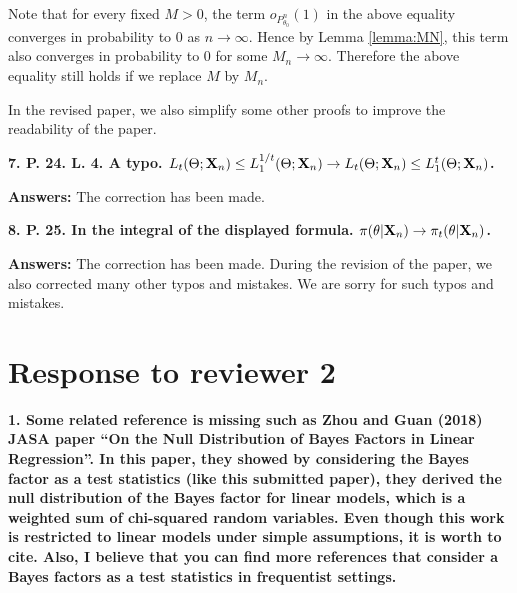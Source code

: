 \documentclass[11pt]{article}
\theoremstyle{plain}
\theoremstyle{definition}
\theoremstyle{remark}
\begin{document}
Note that for every fixed $M > 0$, the term $o_{P_{\theta_0}^n}(1)$ in the above equality converges in probability to $0$ as $n \to \infty$.
Hence by Lemma \ref{lemma:MN}, this term also converges in probability to $0$ for some $M_n \to \infty$.
Therefore the above equality still holds if we replace $M$ by $M_n$.

In the revised paper, we also simplify some other proofs to improve the readability of the paper.

\textbf{
7.
P. 24. L. 4.
A typo.
$L_t (\Theta ; \mathbf{X}_n) \leq L_1^{1/t}(\Theta ; \mathbf{X}_n) \rightarrow  L_t (\Theta ; \mathbf{X}_n) \leq L_1^{t}(\Theta ; \mathbf{X}_n) $.
}


\textbf{Answers:}
The correction has been made.

\textbf{
8.
P. 25.
In the integral of the displayed formula. $\pi(\theta | \mathbf{X}_n) \rightarrow \pi_t (\theta | \mathbf{X}_n)$.
}

\textbf{Answers:}
The correction has been made.
During the revision of the paper, we also corrected many other typos and mistakes.
We are sorry for such typos and mistakes.

\section{Response to reviewer 2}
\textbf{
    1.
    Some related reference is missing such as Zhou and Guan (2018) JASA paper “On the Null Distribution of Bayes Factors in Linear Regression”.
    In this paper, they showed by considering the Bayes factor as a test statistics (like this submitted paper), they derived the null distribution of the Bayes factor for linear models, which is a weighted sum of chi-squared random variables.
    Even though this work is restricted to linear models under simple assumptions, it is worth to cite.
    Also, I believe that you can find more references that consider a Bayes factors as a test statistics in frequentist settings.
}
\end{document}
